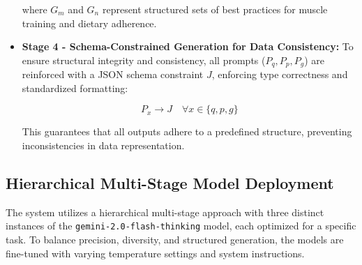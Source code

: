 \documentclass[conference]{IEEEtran}
\begin{document}
\begin{itemize}
    where $G_m$ and $G_n$ represent structured sets of best practices for muscle training and dietary adherence.

    \item \textbf{Stage 4 - Schema-Constrained Generation for Data Consistency:}  
    To ensure structural integrity and consistency, all prompts ($P_q, P_p, P_g$) are reinforced with a JSON schema constraint $J$, enforcing type correctness and standardized formatting:

    \[
    P_x \rightarrow J \quad \forall x \in \{q, p, g\}
    \]

    This guarantees that all outputs adhere to a predefined structure, preventing inconsistencies in data representation.
\end{itemize}

\subsection{Hierarchical Multi-Stage Model Deployment}
The system utilizes a hierarchical multi-stage approach with three distinct instances of the \texttt{gemini-2.0-flash-thinking} model, each optimized for a specific task. To balance precision, diversity, and structured generation, the models are fine-tuned with varying temperature settings and system instructions.
\end{document}
